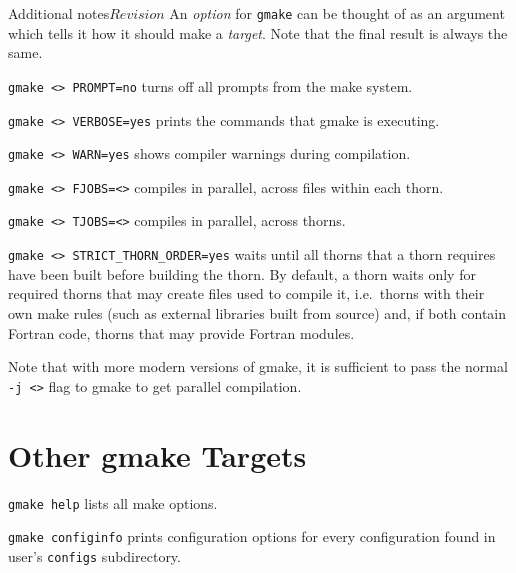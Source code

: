 \begin{cactuspart}{Additional notes}{}{$Revision$}
An \textit{option} for \texttt{gmake} can be thought of as an argument which tells
it how it should make a \textit{target}. Note that the final result is always
the same.

\begin{Lentry}
\item [\texttt{gmake <\var{target}> PROMPT=no}] turns off all prompts from the
make system.
\item [\texttt{gmake <\var{target}> VERBOSE=yes}] prints the commands that
gmake is executing.
\item [\texttt{gmake <\var{target}> WARN=yes}] shows compiler warnings during
compilation.
\item [\texttt{gmake <\var{target}> FJOBS=<\var{number}>}] compiles in parallel,
across files within each thorn.
\item [\texttt{gmake <\var{target}> TJOBS=<\var{number}>}] compiles in parallel,
across thorns.
\item [\texttt{gmake <\var{target}> STRICT\_THORN\_ORDER=yes}] waits
until all thorns that a thorn requires have been built before building
the thorn.  By default, a thorn waits only for required thorns that
may create files used to compile it, i.e.\ thorns with their own make
rules (such as external libraries built from source) and, if both
contain Fortran code, thorns that may provide Fortran modules.

\end{Lentry}

Note that with more modern versions of gmake, it is sufficient to pass the
normal \texttt{-j <>} flag to gmake to get parallel compilation.





\section{Other gmake Targets}

\begin{Lentry}

\item [\texttt{gmake help}] lists all make options.

\item [\texttt{gmake configinfo}] prints configuration options for every
configuration found in user's \texttt{configs} subdirectory.


\end{Lentry}
\end{cactuspart}
